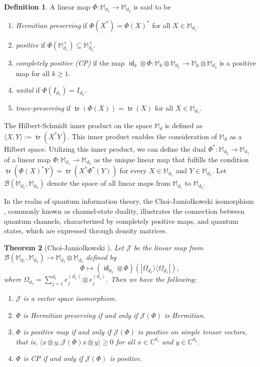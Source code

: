 \documentclass[10pt,reqno]{amsart}
\theoremstyle{definition}
\newtheorem{defn}{Definition}[section]
\theoremstyle{plain}
\newtheorem{thm}[defn]{Theorem}
\theoremstyle{remark}
\renewcommand{\sf}[1]{\textsf{#1}}
\newcommand{\mbb}[1]{\mathbb{#1}}
\newcommand{\msc}[1]{\mathscr{#1}}
\newcommand{\M}[1]{\mbb{M}_{#1}}%
\newcommand{\B}[1]{\msc{B}({#1})}
\newcommand{\ranko}[2]{|{#1}\rangle\langle{#2}|}
\newcommand{\ip}[1]{\langle#1\rangle}
\DeclareMathOperator{\tr}{\sf{tr}}
\DeclareMathOperator{\id}{\sf{id}}
\numberwithin{equation}{section}%
\begin{document}
\begin{defn}
	A linear  map $\Phi:\M{d_1}\to\M{d_2}$ is said to be 
	\begin{enumerate}[label=(\roman*)]
		\item \emph{Hermitian preserving} if $\Phi(X^*)=\Phi(X)^*$ for all $X\in\M{d_1}$.
		\item \emph{positive} if $\Phi(\M{d_1}^+)\subseteq \M{d_2}^+$.
		\item \emph{completely positive (CP)} if the map $\id_k\otimes\Phi:\M{k}\otimes\M{d_1}\to\M{k}\otimes\M{d_2}$ is a positive map for all $k\geq 1$.
		\item \emph{unital} if $\Phi(I_{d_1})=I_{d_2}$.
		\item \emph{trace-preserving } if $\tr(\Phi(X))=\tr(X)$ for all $X\in\M{d_1}$.
	\end{enumerate}
\end{defn}




The Hilbert-Schmidt inner product on the space $\M{d}$ is defined as $\ip{X, Y}:=\tr(X^*Y)$. This inner product enables the consideration of $\M{d}$ as a Hilbert space. Utilizing this inner product, we can define the dual $\Phi^*:\M{d_2}\to\M{d_1}$ of a linear map $\Phi:\M{d_1}\to\M{d_2}$ as the unique linear map that fulfills the condition $\tr({\Phi(X)}^*Y)=\tr(X^*\Phi^*(Y))$ for every $X\in\M{d_1}$ and $Y\in\M{d_2}$. Let $\B{\M{d_1},\M{d_2}}$ denote the space of all linear maps from $\M{d_1}$ to $\M{d_2}$.



In the realm of quantum information theory, the Choi-Jamio\l kowski isomorphism \cite{Cho75, Jam72}, commonly known as channel-state duality, illustrates the connection between quantum channels, characterized by completely positive maps, and quantum states, which are expressed through density matrices.



\begin{thm}[Choi-Jamio\l kowski \cite{Cho75, Jam72}]\label{thm-C-J-map}
	Let $\msc{J}$ be the linear map from $\B{\M{d_1},\M{d_2}}\to\M{d_1}\otimes\M{d_2}$ defined by 
	$$\Phi\mapsto (\id_{d_1}\otimes \Phi)(\ranko{\Omega_{d_1}}{\Omega_{d_1}}),$$
	where $\Omega_{d_1}=\sum_{j=1}^{d_1}e_j^{(d_1)}\otimes e_j^{(d_1)}$. Then we have the following:
	
	\begin{enumerate}
		\item $\msc{J}$ is a vector space isomorphism. 
		\item $\Phi$ is Hermitian preserving if and only if $\msc{J}(\Phi)$ is Hermitian.
		\item $\Phi$ is positive map if and only if $\msc{J}(\Phi)$ is positive on simple tensor vectors, that is, $\ip{x\otimes y, \msc{J}(\Phi)x\otimes y}\geq 0$ for all $x\in\mbb{C}^{d_1}$ and $y\in\mbb{C}^{d_2}$. 
		\item $\Phi$ is CP if and only if $\msc{J}(\Phi)$ is positive. 
	\end{enumerate}
\end{thm}
\end{document}
